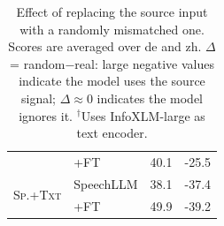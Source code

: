 \begin{table}[t]
\begin{tabular}{ll|rc}
 & \quad+FT & \cellcolor[RGB]{202,232,231}40.1 & \cellcolor[RGB]{193,214,235}-25.5 \\
\multirow{2}{*}{\textsc{Sp.+Txt}} & SpeechLLM & \cellcolor[RGB]{205,233,233}38.1 & \cellcolor[RGB]{161,193,224}-37.4 \\
 & \quad+FT & \cellcolor[RGB]{183,224,223}49.9 & \cellcolor[RGB]{156,190,223}-39.2 \\
\bottomrule
\end{tabular}
\caption{Effect of replacing the source input with a randomly mismatched one. Scores are averaged over de and zh. $\Delta$ = random$-$real: large negative values indicate the model uses the source signal; $\Delta \approx 0$ indicates the model ignores it. $^\dagger$Uses InfoXLM-large as text encoder.}\label{tab:random_src}
\end{table}
